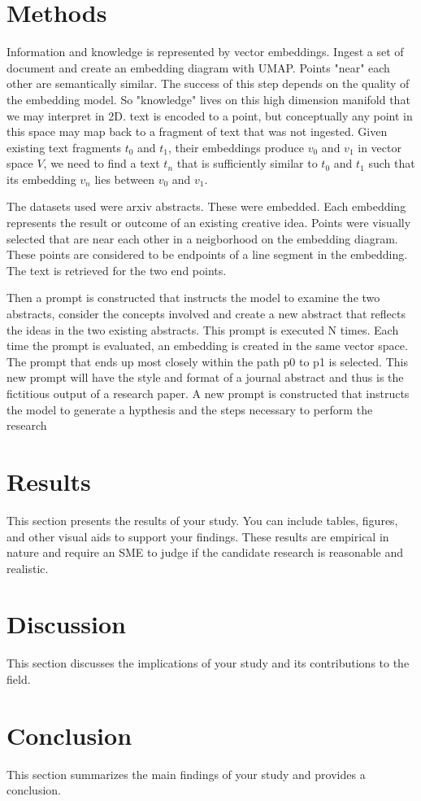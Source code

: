 \documentclass[twocolumn]{article}
\begin{document}
\section{Methods}
Information and knowledge is represented by vector embeddings.  Ingest a set of document and create an embedding diagram with UMAP.   Points "near" each other are semantically similar.  The success of 
this step depends on the quality of the embedding model.   So "knowledge" lives on this high dimension manifold that we may interpret in 2D.  text is encoded to a point, but conceptually any point in this space 
may map back to a fragment of text that was not ingested.   Given existing text fragments \( t_0 \) and \( t_1 \), their embeddings produce \( v_0 \) and \( v_1 \) in vector space \( V \), we need to find 
a text \( t_n \) that is sufficiently similar to \( t_0 \) and \( t_1 \) such that its embedding \( v_n \) lies between \( v_0 \) and \( v_1 \).

The datasets used were arxiv abstracts.   These were embedded.   Each embedding represents the result or outcome of an existing creative idea.  Points were visually selected that are near each other
in a neigborhood on the embedding diagram.   These points are considered to be endpoints of a line segment in the embedding.   The text is retrieved for the two end points.

Then a prompt is constructed that instructs the model to examine the two abstracts, consider the concepts involved and create a new abstract that reflects the ideas in the two existing abstracts.   This 
prompt is executed N times.  Each time the prompt is evaluated, an embedding is created in the same vector space.   The prompt that ends up most closely within the path p0 to p1 is selected.   This new prompt will 
have the style and format of a journal abstract and thus is the fictitious output of a research paper.   A new prompt is constructed that instructs the model to generate a hypthesis and the steps necessary 
to perform the research


\section{Results}
This section presents the results of your study. You can include tables, figures, and other visual aids to support your findings.
These results are empirical in nature and require an SME to judge if the candidate research is reasonable and realistic.

\section{Discussion}
This section discusses the implications of your study and its contributions to the field.

\section{Conclusion}
This section summarizes the main findings of your study and provides a conclusion.



\end{document}
